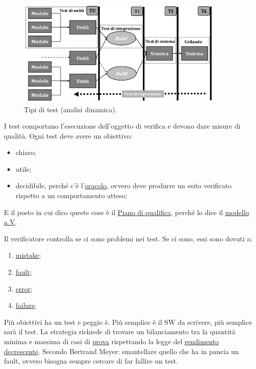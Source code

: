 		\begin{figure}[H]
			\centering
			\includegraphics[width=0.9\textwidth]{img/test}		
			\caption{Tipi di test (analisi dinamica).}
		\end{figure} 
		I test comportano l'esecuzione dell'oggetto di verifica e devono dare misure di qualità. Ogni test deve avere un obiettivo:
		\begin{itemize}
			\item chiaro;
			\item utile;
			\item decidibile, perché c'è l'\underline{\hyperref[oracolo]{oracolo}}, ovvero deve produrre un esito verificato rispetto a un comportamento atteso;
		\end{itemize}	
		E il posto in cui dico queste cose è il \underline{\hyperref[pianoqualifica]{Piano di qualifica}}, perché lo dice il \underline{\hyperref[V]{modello a V}}. 
		
		Il verificatore controlla se ci sono problemi nei test. Se ci sono, essi sono dovuti a:
		\begin{enumerate}
			\item \underline{\hyperref[mistake]{mistake}};
			\item \underline{\hyperref[fault]{fault}};
			\item \underline{\hyperref[error]{error}};
			\item \underline{\hyperref[failure]{failure}}.
		\end{enumerate}
		Più obiettivi ha un test e peggio è. Più semplice è il SW da scrivere, più semplice sarà il test. La strategia richiede di trovare un bilanciamento tra la quantità minima e massima di casi di \underline{\hyperref[prova]{prova}} rispettando la legge del \underline{\hyperref[diminishingreturn]{rendimento decrescente}}.
		Secondo Bertrand Meyer: smantellare quello che ha in pancia un fault, ovvero bisogna sempre cercare di far fallire un test. \\ %
		
